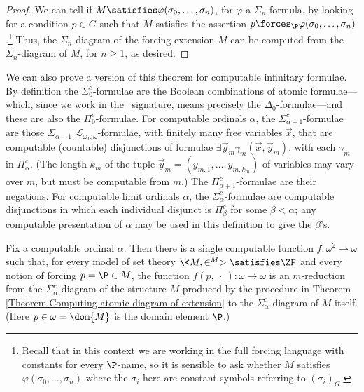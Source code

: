 \documentclass{amsart}
\newcommand{\xvec}{\vec{x}}
\newcommand{\yvec}{\vec{y}}
\begin{document}
\begin{proof}
We can tell if $M\satisfies\varphi(\sigma_0,\ldots,\sigma_n)$, for $\varphi$ a $\Sigma_n$-formula, by looking for a condition $p\in G$ such that $M$ satisfies the assertion $p\forces_\P\varphi(\sigma_0,\ldots,\sigma_n)$.\footnote{Recall that in this context we are working in the full forcing language with constants for every $\P$-name, so it is sensible to ask whether $M$ satisfies $\varphi(\sigma_0,\ldots, \sigma_n)$ where the $\sigma_i$ here are constant symbols referring to $(\sigma_i)_G$.}
Thus, the $\Sigma_n$-diagram of the forcing extension $M$ can be computed from the $\Sigma_n$-diagram of $M$, for $n\geq 1$, as desired.
\end{proof}
We can also prove a version of this theorem for computable infinitary formulae. By definition the $\Sigma_0^c$-formulae are the Boolean combinations of atomic formulae---which, since we work in the \Levy\ signature, means precisely the $\Delta_0$-formulae---and these are also the $\Pi_0^c$-formulae.
For computable ordinals $\alpha$, the $\Sigma_{\alpha+1}^c$-formulae are those $\Sigma_{\alpha+1}$ $\mathcal{L}_{\omega_1,\omega}$-formulae, with finitely many free variables $\xvec$, that are computable (countable) disjunctions of formulae $\exists \yvec_m \gamma_m(\xvec, \yvec_m)$, with each $\gamma_m$ in $\Pi_{\alpha}^c$. (The length $k_m$ of the tuple $\yvec_m=(y_{m,1},\ldots,y_{m,{k_m}})$ of variables may vary over $m$, but must be computable from $m$.) The $\Pi_{\alpha+1}^c$-formulae are their negations. For computable limit ordinals $\alpha$, the $\Sigma_{\alpha}^c$-formulae are computable disjunctions in which each individual disjunct is $\Pi_{\beta}^c$ for some $\beta < \alpha$; any computable presentation of $\alpha$ may be used in this definition to give the $\beta$'s.
\begin{theorem} \label{Theorem.Computing-infinitary-diagram}
Fix a computable ordinal $\alpha$.
Then there is a single computable function $f:\omega^2\to\omega$
such that, for every model of set theory $\<M,\in^M>\satisfies\ZF$
and every notion of forcing $p=\P\in M$, the function
$f(p,~\cdot~):\omega\to\omega$ is an $m$-reduction from the $\Sigma_\alpha^c$-diagram
of the structure $M$ produced by the procedure in
Theorem \ref{Theorem.Computing-atomic-diagram-of-extension}
to the $\Sigma_\alpha^c$-diagram of $M$ itself.
(Here $p\in\omega=\dom{M}$ is the domain element $\P$.)
\end{theorem}
\end{document}
